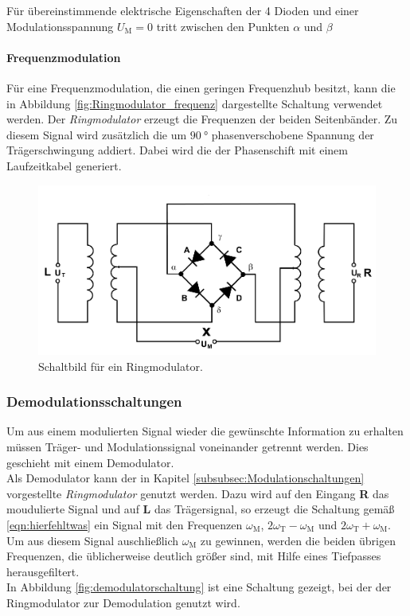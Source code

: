 Für übereinstimmende elektrische Eigenschaften
der 4 Dioden und einer Modulationsspannung $U_{\text{M}}=0$
tritt zwischen den Punkten $\alpha$ und $\beta$






\paragraph{Frequenzmodulation}
Für eine Frequenzmodulation, die einen geringen Frequenzhub besitzt,
kann die in Abbildung \ref{fig:Ringmodulator_frequenz} dargestellte
Schaltung verwendet werden.
Der \textit{Ringmodulator} erzeugt die Frequenzen der beiden Seitenbänder.
Zu diesem Signal wird zusätzlich die um $\SI{90}{\degree}$ phasenverschobene
Spannung der Trägerschwingung addiert. Dabei wird die der Phasenschift
mit einem Laufzeitkabel generiert.

\begin{figure}
  \centering
  \includegraphics{figures/Ringmodulator.PNG}
  \caption{Schaltbild für ein Ringmodulator.}
  \label{fig:Ringmodulator}
\end{figure}

\subsubsection{Demodulationsschaltungen}
\label{subsubsec:demodulationschaltungen}
Um aus einem modulierten Signal wieder die gewünschte Information zu erhalten
müssen Träger- und Modulationssignal voneinander getrennt werden.
Dies geschieht mit einem Demodulator.\\
Als Demodulator kann der in Kapitel \ref{subsubsec:Modulationschaltungen}
vorgestellte \textit{Ringmodulator} genutzt werden.
Dazu wird auf den Eingang \textbf{R} das moudulierte Signal und
auf \textbf{L} das Trägersignal, so erzeugt die Schaltung
gemäß \eqref{eqn:hierfehltwas} ein Signal mit den Frequenzen
$\omega_{\text{M}}$, $2\omega_{\text{T}} - \omega_{\text{M}}$
und $2\omega_{\text{T}} + \omega_{\text{M}}$.
Um aus diesem Signal auschließlich $\omega_{\text{M}}$ zu gewinnen,
werden die beiden übrigen Frequenzen, die üblicherweise deutlich größer sind,
mit Hilfe eines Tiefpasses herausgefiltert.\\
In Abbildung \ref{fig:demodulatorschaltung} ist eine Schaltung gezeigt,
bei der der Ringmodulator zur Demodulation genutzt wird.
